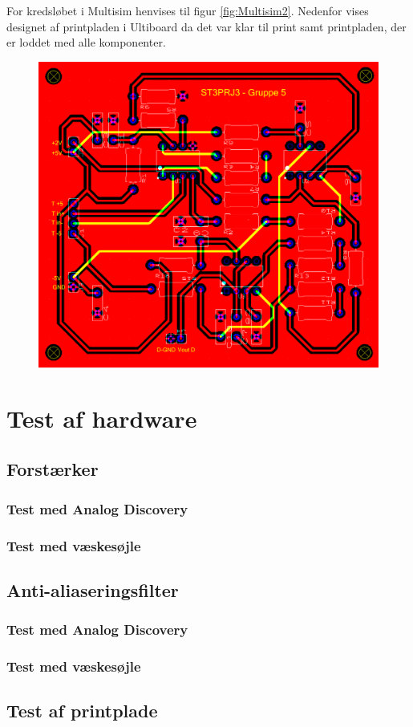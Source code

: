 For kredsløbet i Multisim henvises til figur \vref{fig:Multisim2}. Nedenfor vises designet af printpladen i Ultiboard da det var klar til print samt printpladen, der er loddet med alle komponenter.

\begin{figure}[h!]
	\centering
	\includegraphics[width=0.5\linewidth]{../Rapport/Implementering_og_test/Hardware/Ultiboard}
	\caption[Print i Ultiboard]{}
	\label{fig:ultiboard1}
\end{figure}

\clearpage


\section{Test af hardware}
\subsection{Forstærker}

\subsubsection{Test med Analog Discovery}
\subsubsection{Test med væskesøjle}
\subsection{Anti-aliaseringsfilter}
\subsubsection{Test med Analog Discovery}
\subsubsection{Test med væskesøjle}
\subsection{Test af printplade}
